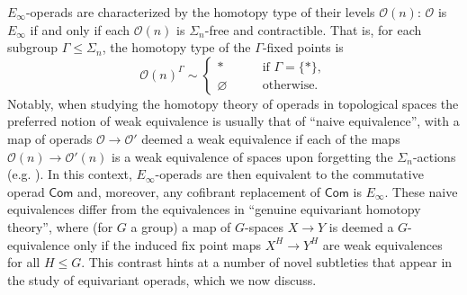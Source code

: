 \documentclass[a4paper,10pt
,draft
]{article}%
\numberwithin{equation}{section}
\numberwithin{figure}{section}
\theoremstyle{definition} %
\renewcommand{\O}{\ensuremath{\mathcal O}}
\newcommand{\1}{\ensuremath{\mathbbm 1}}%
\begin{document}
$E_\infty$-operads are characterized by the homotopy type of their levels $\O(n)$: $\O$ is $E_\infty$ if and only if each $\O(n)$ is $\Sigma_n$-free and contractible. That is, for each subgroup $\Gamma \leq \Sigma_n$,
the homotopy type of the $\Gamma$-fixed points is
\[
\O(n)^\Gamma \sim
\begin{cases}
        * & \text{if } \Gamma = \{*\} , \\
        \varnothing \qquad & \text{otherwise.}
\end{cases}
\]
Notably, when studying the homotopy theory of operads in topological spaces
the preferred notion of weak equivalence is 
usually that of ``naive equivalence'',
with a map of operads 
$\O \to \O'$
deemed a weak equivalence if each of the maps
$\O(n) \to \O'(n)$
is a weak equivalence of spaces
upon forgetting the $\Sigma_n$-actions (e.g. \cite[3.2]{BM03}).
In this context, $E_\infty$-operads are then equivalent to the commutative operad $\mathsf{Com}$
and, moreover, 
any cofibrant replacement of $\mathsf{Com}$
is $E_{\infty}$.
These naive equivalences differ from the equivalences in ``genuine equivariant homotopy theory'',
where (for $G$ a group) a map of $G$-spaces $X \to Y$ is deemed a $G$-equivalence only if
the induced fix point maps $X^H \to Y^H$ are weak equivalences for all $H \leq G$.
This contrast hints at a number of novel subtleties that appear in the study of equivariant operads, which we now discuss.
\end{document}
